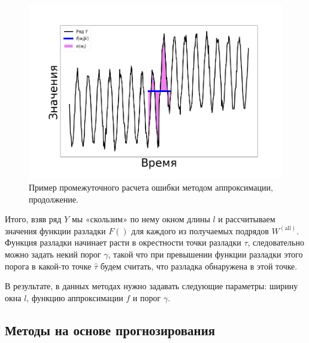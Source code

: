 \documentclass[%
12pt,
master,  %
natbib,      %
subf,        %
substylefile = spbu.rtx,
href,        %
colorlinks,  %
]{disser}
\begin{document}
\begin{figure}[!hhh]
	\begin{center}
		\includegraphics[width=12cm]{approaches_second_3_ru}
	\end{center}
	\vspace{-5mm}\caption{Пример промежуточного расчета ошибки методом аппроксимации, продолжение.}
	\label{fig:approximation_example_2}
\end{figure}


Итого, взяв ряд $Y$ мы «скользим» по нему окном длины $l$ и рассчитываем значения функции разладки $F()$ для каждого из получаемых подрядов $W^{\mathrm{(all)}}$. Функция разладки начинает расти в окрестности точки разладки $\tau$, следовательно можно задать некий порог $\gamma$, такой что при превышении функции разладки этого порога в какой-то точке $\hat{\tau}$ будем считать, что разладка обнаружена в этой точке.

В результате, в данных методах нужно задавать следующие параметры: ширину окна $l$, функцию аппроксимации $f$ и порог $\gamma$.

\subsection{Методы на основе прогнозирования}
\end{document}
